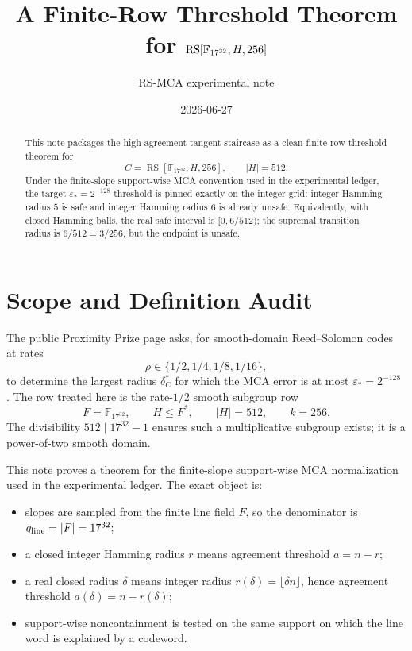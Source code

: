 \documentclass[11pt]{article}
\title{A Finite-Row Threshold Theorem for \texorpdfstring{$\RS[\F_{17^{32}},H,256]$}{RS[F17^32,H,256]}}
\author{RS-MCA experimental note}
\date{2026-06-27}
\theoremstyle{remark}
\newcommand{\F}{\mathbb F}
\newcommand{\RS}{\operatorname{RS}}
\newcommand{\eps}{\varepsilon}
\newcommand{\qline}{q_{\rm line}}
\begin{document}
\maketitle

\begin{abstract}
This note packages the high-agreement tangent staircase as a clean finite-row
threshold theorem for
\[
  C=\RS[\F_{17^{32}},H,256],
  \qquad |H|=512.
\]
Under the finite-slope support-wise MCA convention used in the experimental
ledger, the target \(\eps_*=2^{-128}\) threshold is pinned exactly on the
integer grid: integer Hamming radius \(5\) is safe and integer Hamming radius
\(6\) is already unsafe.  Equivalently, with closed Hamming balls, the real
safe interval is \([0,6/512)\); the supremal transition radius is
\(6/512=3/256\), but the endpoint is unsafe.
\end{abstract}

\section{Scope and Definition Audit}
\label{sec:scope}

The public Proximity Prize page asks, for smooth-domain Reed--Solomon codes at
rates
\[
  \rho\in\{1/2,1/4,1/8,1/16\},
\]
to determine the largest radius \(\delta_C^*\) for which the MCA error is at
most \(\eps_*=2^{-128}\) \cite{ProximityPrize2026}.  The row treated here is the
rate-\(1/2\) smooth subgroup row
\[
  F=\F_{17^{32}},\qquad H\le F^*,\qquad |H|=512,\qquad k=256.
\]
The divisibility \(512\mid 17^{32}-1\) ensures such a multiplicative subgroup
exists; it is a power-of-two smooth domain.

This note proves a theorem for the finite-slope support-wise MCA normalization
used in the experimental ledger.  The exact object is:
\begin{itemize}
\item slopes are sampled from the finite line field \(F\), so the denominator is
  \(\qline=|F|=17^{32}\);
\item a closed integer Hamming radius \(r\) means agreement threshold
  \(a=n-r\);
\item a real closed radius \(\delta\) means integer radius
  \(r(\delta)=\lfloor \delta n\rfloor\), hence agreement threshold
  \(a(\delta)=n-r(\delta)\);
\item support-wise noncontainment is tested on the same support on which the
  line word is explained by a codeword.
\end{itemize}
\end{document}
